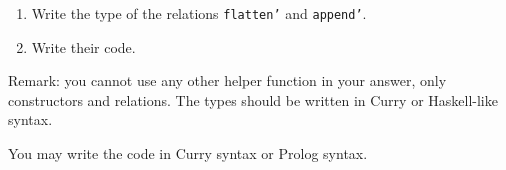 \documentclass{article}
\newcommand{\answer}[1]{}
\begin{document}
\begin{enumerate}
\item Write the type of the relations \texttt{flatten'} and
  \texttt{append'}. 
\item Write their code. 
\end{enumerate}

Remark: you cannot use any other helper function in your answer, only
constructors and relations. The types should be written in Curry or
Haskell-like syntax.

You may write the code in Curry syntax or Prolog syntax. 
\answer{
\begin{verbatim}
    append :: List -> List -> List -> Success
    append []     ys zs = ys =:= zs
    append (x:xs) ys zs = append xs ys zs' `and`
                          zs =:= x:zs'
       where zs' free

   flatten :: Tree -> List -> Success
   flatten Tip Nil = success
   flatten (Bin a x b) zs = flatten a xs `and` flatten b ys `and` append xs (Cons x ys) zs
      where xs, ys free
\end{verbatim}
}
\end{document}
